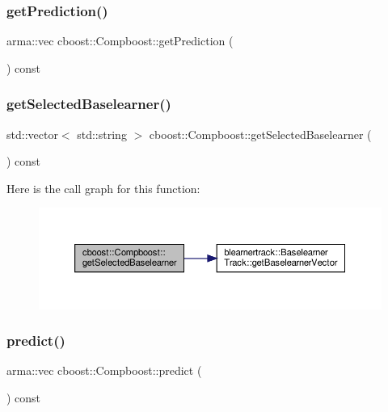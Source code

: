 \subsubsection{\texorpdfstring{get\+Prediction()}{getPrediction()}}
{\footnotesize\ttfamily arma\+::vec cboost\+::\+Compboost\+::get\+Prediction (\begin{DoxyParamCaption}{ }\end{DoxyParamCaption}) const}

\mbox{\label{classcboost_1_1_compboost_ac66d4490e6539832d4d304a86db746dc}} 
\subsubsection{\texorpdfstring{get\+Selected\+Baselearner()}{getSelectedBaselearner()}}
{\footnotesize\ttfamily std\+::vector$<$ std\+::string $>$ cboost\+::\+Compboost\+::get\+Selected\+Baselearner (\begin{DoxyParamCaption}{ }\end{DoxyParamCaption}) const}

Here is the call graph for this function\+:\nopagebreak
\begin{figure}[H]
\begin{center}
\leavevmode
\includegraphics[width=350pt]{classcboost_1_1_compboost_ac66d4490e6539832d4d304a86db746dc_cgraph}
\end{center}
\end{figure}
\mbox{\label{classcboost_1_1_compboost_a32d1066a24607ff6ef2f934002adf62b}} 
\subsubsection{\texorpdfstring{predict()}{predict()}\hspace{0.1cm}{\footnotesize\ttfamily [1/2]}}
{\footnotesize\ttfamily arma\+::vec cboost\+::\+Compboost\+::predict (\begin{DoxyParamCaption}{ }\end{DoxyParamCaption}) const}

